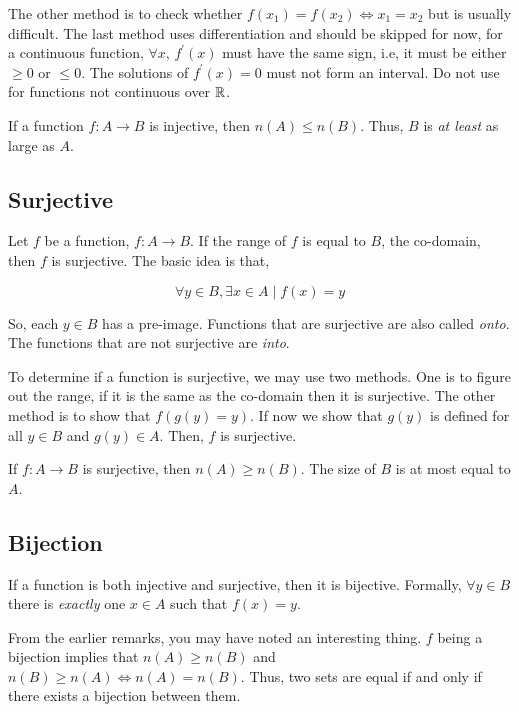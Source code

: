The other method is to check whether \(f(x_1) = f(x_2) \iff x_1 = x_2 \) but is usually
difficult.
The last method uses differentiation and should be skipped for now,
for a continuous function, \(\forall x\), \(f^\prime(x)\) must have the same sign, i.e,
it must be either \(\ge 0\) or \(\le 0\). The solutions of \(f^{\prime} (x) = 0\) must
not form an interval. Do not use for functions not continuous over \(\mathbb R\). 

\begin{remark}
    If a function \(f : A \to B\) is injective, then \(n(A) \le n(B)\). Thus,
    \(B\) is \emph{at least} as large as \(A\).
\end{remark}

\subsection{Surjective}


Let \(f\) be a function, \(f : A \to B\). If the range of \(f\) is equal to \(B\),
the co-domain, then \(f\) is surjective. The basic idea is that,

\[
    \forall y \in B, \exists x \in A \mid f(x) = y
\]

So, each \(y \in B\) has a pre-image. Functions that are surjective are also called
\emph{onto}. The functions that are not surjective are \emph{into}.

To determine if a function is surjective, we may use two methods. One is
to figure out the range, if it is the same as the co-domain then it is surjective. 
The other method is to show that \(f(g(y) = y)\). If now we show
that \(g(y)\) is defined for all \(y \in B\) and \(g(y) \in A\). Then, \(f\) is
surjective.

\begin{remark}
    If \(f : A \to B\) is surjective, then \(n(A) \ge n(B)\). The size of \(B\)
    is at most equal to \(A\).
\end{remark}

\subsection{Bijection}

If a function is both injective and surjective, then it is bijective.
Formally, \(\forall y \in B\) there is \emph{exactly} one \(x \in A\) such that
\(f(x) = y\). 

From the earlier remarks, you may have noted an interesting thing. \(f\) being
a bijection implies that \(n(A) \ge n(B)\) and \(n(B) \ge n(A) \iff n(A) = n(B)\).
Thus, two sets are equal if and only if there exists a bijection between them.

